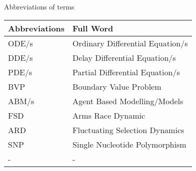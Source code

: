 Abbreviations of terms

\begin{table}[ht!]
    \begin{tabular}{|l|l|}
        \hline
        Abbreviations & Full Word                         \\ \hline
        ODE/s         & Ordinary Differential Equation/s \\ \hline
        DDE/s         & Delay Differential Equation/s \\ \hline
        PDE/s         & Partial Differential Equation/s \\ \hline
        BVP  & Boundary Value Problem \\ \hline
        ABM/s  & Agent Based Modelling/Models \\ \hline
        FSD  & Arms Race Dynamic \\ \hline
        ARD  & Fluctuating Selection Dynamics \\ \hline
        SNP  & Single Nucleotide Polymorphism \\ \hline
        -  & - \\ \hline
    \end{tabular}
\end{table}
